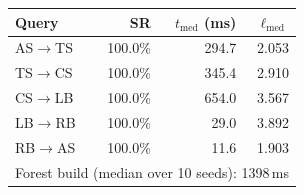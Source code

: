 \begin{tabular}{lrrr}
  \toprule
  Query & SR & $t_{\mathrm{med}}$ (ms) & $\ell_{\mathrm{med}}$ \\
  \midrule
  AS$\rightarrow$TS & 100.0\% & 294.7 & 2.053 \\
  TS$\rightarrow$CS & 100.0\% & 345.4 & 2.910 \\
  CS$\rightarrow$LB & 100.0\% & 654.0 & 3.567 \\
  LB$\rightarrow$RB & 100.0\% & 29.0 & 3.892 \\
  RB$\rightarrow$AS & 100.0\% & 11.6 & 1.903 \\
  \midrule
  \multicolumn{4}{l}{Forest build (median over 10 seeds): 1398\,ms} \\
  \bottomrule
\end{tabular}
